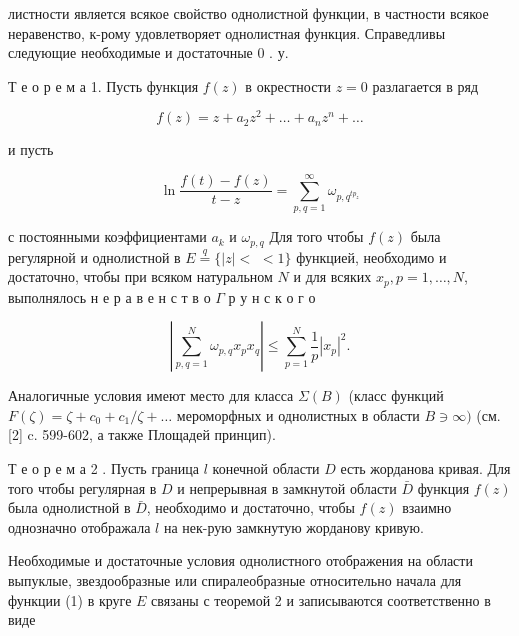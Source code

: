 \documentclass[10pt]{article}
\begin{document}
листности является всякое свойство однолистной функции, в частности всякое неравенство, к-рому удовлетворяет однолистная функция. Справедливы следующие необходимые и достаточные 0 . у.



Т е о р е м а 1. Пусть функция $f(z)$ в окрестности $z=0$ разлагается в ряд



\[

f(z)=z+a_{2} z^{2}+\ldots+a_{n} z^{n}+\ldots

\]



и пусть



\[

\ln \frac{f(t)-f(z)}{t-z}=\sum_{p, q=1}^{\infty} \omega_{p, q^{t p_{z}}}

\]



с постоянными коэффициентами $a_{k}$ и $\omega_{p, q}$ Для того чтобы $f(z)$ была регулярной и однолистной в $E \stackrel{q}{=}\{|z|<$ $<1\}$ функцией, необходимо и достаточно, чтобы при всяком натуральном $N$ и для всяких $x_{p}, p=1, \ldots, N$, выполнялось н е р а в е н с т в о $\Gamma$ р у н с к о г о



\[

\left|\sum_{p, q=1}^{N} \omega_{p, q} x_{p} x_{q}\right| \leqslant \sum_{p=1}^{N} \frac{1}{p}\left|x_{p}\right|^{2} .

\]



Аналогичные условия имеют место для класса $\Sigma(B)$ (класс функций $F(\zeta)=\zeta+c_{0}+c_{1} / \zeta+\ldots$ мероморфных и однолистных в области $B \ni \infty)$ (см. [2] c. 599-602, а также Площадей принцип).



Т е о р е м а 2 . Пусть граница $l$ конечной области $D$ есть жорданова кривая. Для того чтобы регулярная в $D$ и непрерывная в замкнутой области $\bar{D}$ функция $f(z)$ была однолистной в $\bar{D}$, необходимо и достаточно, чтобы $f(z)$ взаимно однозначно отображала $l$ на нек-рую замкнутую жорданову кривую.



Необходимые и достаточные условия однолистного отображения на области выпуклые, звездообразные или спиралеобразные относительно начала для функции (1) в круге $E$ связаны с теоремой 2 и записываются соответственно в виде
\end{document}
